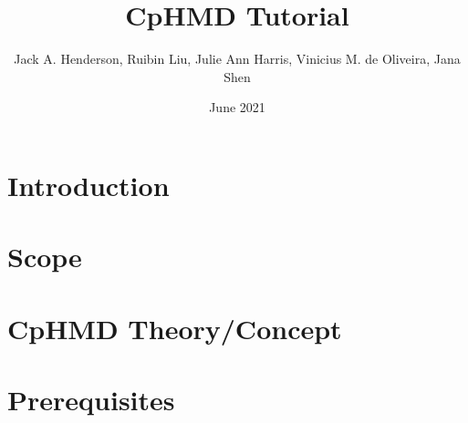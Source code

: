 \documentclass{article}
\title{CpHMD Tutorial}
\author{Jack A. Henderson, Ruibin Liu, Julie Ann Harris, Vinicius M. de Oliveira, Jana Shen}
\date{June 2021}
\begin{document}
\maketitle

\section{Introduction}


\section{Scope}

\section{CpHMD Theory/Concept}


\section{Prerequisites}
\end{document}

